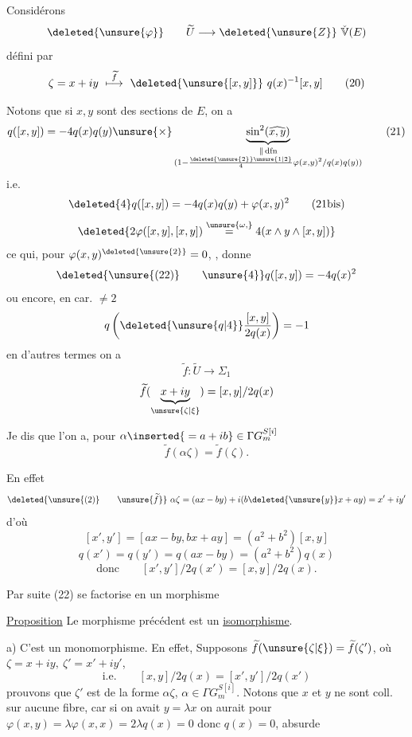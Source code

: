 Considérons
\[
\deleted{\unsure{\varphi}}\qquad\widetilde U\longrightarrow\deleted{\unsure{Z}}\ \check{\mathbb V}(E)
\]
défini par
\[
\zeta=x+iy\ \overset{\widetilde f}{\longmapsto}\ \deleted{\unsure{[x,y]}}\ q(x)^{-1}[x,y]\tag*{(20)}
\]

Notons que si $x,y$ sont des sections de $E$, on a
\[
q([x,y])=-4q(x)q(y)\unsure{\times}\underbrace{\sin^2(\widehat{x,y})}_{\substack{\Vert\,\mathrm{dfn}\\(1-\frac{\deleted{\unsure{2}}\unsure{1|2}}4\varphi(x,y)^2/q(x)q(y))}}\tag*{(21)}
\]
i.e.
\[
\deleted{4}q([x,y])=-4q(x)q(y)+\varphi(x,y)^2\tag*{(21bis)}
\]
\[
\deleted{2\varphi([x,y],[x,y])\overset{\unsure{\omega,}}{=}4(x\wedge y\wedge[x,y])}
\]
ce qui, pour $\varphi(x,y)^{\deleted{\unsure{2}}}=0$, , donne
\[
\deleted{\unsure{\text{(22)}}\qquad\unsure{4}}q([x,y])=-4q(x)^2
\]
ou encore, en car.  $\ne2$
\[
q\left(\deleted{\unsure{q|4}}\frac{[x,y]}{2q(x)}\right)=-1
\]
en d'autres termes on a
\[
\widetilde f:\widetilde U\longrightarrow\Sigma_1\tag*{(22)}
\]
\[
\widetilde f(\underbrace{x+iy}_{\unsure{\zeta|\xi}})=[x,y]/2q(x)
\]

Je dis que l'on a, pour $\alpha\inserted{{}=a+ib}\in\Gamma G_m^{S[i]}$
\[
\widetilde f(\alpha\zeta)=\widetilde f(\zeta).
\]

En effet
\[
\deleted{\unsure{(2)}\qquad\unsure{\widetilde f}}\ \alpha\zeta=(ax-by)+i(b\deleted{\unsure{y}}x+ay)=x'+iy'
\]
d'où
\[
[x',y']=[ax-by,bx+ay]=(a^2+b^2)[x,y]
\]
\[
q(x')=q(y')=q(ax-by)=(a^2+b^2)q(x)
\]
\[
\text{donc}\qquad [x',y']/2q(x')=[x,y]/2q(x).
\]

Par suite (22) se factorise en un morphisme


\uline{Proposition}  Le morphisme précédent est un \uline{isomorphisme}.

a) C'est un monomorphisme. En effet, Supposons $\widetilde f(\unsure{\zeta|\xi})=\widetilde f(\zeta')$, où $\zeta=x+iy,\ \zeta'=x'+iy'$,
\[
\text{i.e.}\qquad [x,y]/2q(x)=[x',y']/2q(x')
\]
prouvons que $\zeta'$ est de la forme $\alpha\zeta$, $\alpha\in\Gamma G_m^{S[i]}$. Notons que $x$ et $y$ ne sont  coll. sur aucune fibre,  car si on avait $y=\lambda x$ on aurait pour $\varphi(x,y)=\lambda\varphi(x,x)=2\lambda q(x)=0$ donc $q(x)=0$, absurde

